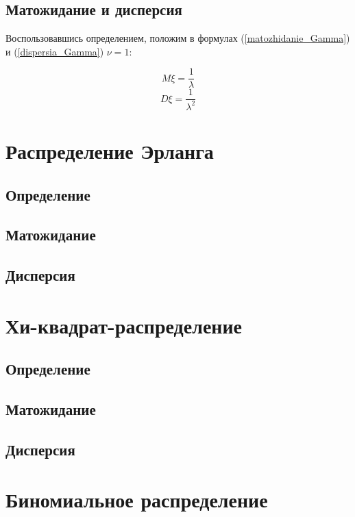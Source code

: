\subsection{Матожидание и дисперсия}
Воспользовавшись определением, положим в формулах (\ref{matozhidanie_Gamma}) и (\ref{dispersia_Gamma}) $\nu=1$:

\begin{equation}
M\xi = 
\frac{1}{\lambda }
\end{equation}
\begin{equation}
D\xi = 
\frac{1}{\lambda^2 }
\end{equation}


\section{Распределение Эрланга}

\subsection{Определение}

\subsection{Матожидание}

\subsection{Дисперсия}

\section{Хи-квадрат-распределение}

\subsection{Определение}

\subsection{Матожидание}

\subsection{Дисперсия}

\section{Биномиальное распределение}

